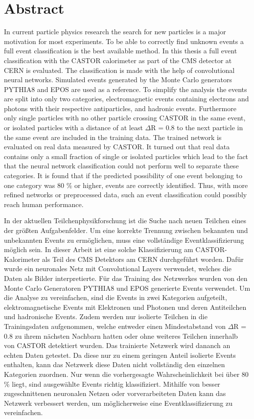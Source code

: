 \section*{Abstract}

In current particle physics research the search for new particles is a major motivation for most experiments. To be able to correctly find unknown events a full event classification is the best available method. In this thesis a full event classification with the CASTOR calorimeter as part of the CMS detector at CERN is evaluated. The classification is made with the help of convolutional neural networks. Simulated events generated by the Monte Carlo generators PYTHIA8 and EPOS are used as a reference. To simplify the analysis the events are split into only two categories, electromagnetic events containing electrons and photons with their respective antiparticles, and hadronic events. Furthermore only single particles with no other particle crossing CASTOR in the same event, or isolated particles with a distance of at least $\Delta$R = 0.8 to the next particle in the same event are included in the training data. The trained network is evaluated on real data measured by CASTOR. It turned out that real data contains only a small fraction of single or isolated particles which lead to the fact that the neural network classification could not perform well to separate these categories. It is found that if the predicted possibility of one event belonging to one category was 80 \% or higher, events are correctly identified. Thus, with more refined networks or preprocessed data, such an event classification could possibly reach human performance.  

\vspace{2cm}

In der aktuellen Teilchenphysikforschung ist die Suche nach neuen Teilchen eines der größten Aufgabenfelder. Um eine korrekte Trennung zwischen bekannten und unbekannten Events zu ermöglichen, muss eine vollständige Eventklassifizierung möglich sein. In dieser Arbeit ist eine solche Klassifizierung am CASTOR-Kalorimeter als Teil des CMS Detektors am CERN durchgeführt worden. Dafür wurde ein neuronales Netz mit Convolutional Layers verwendet, welches die Daten als Bilder interpretierte. Für das Training des Netzwerkes wurden von den Monte Carlo Generatoren PYTHIA8 und EPOS generierte Events verwendet. Um die Analyse zu vereinfachen, sind die Events in zwei Kategorien aufgeteilt, elektromagnetische Events mit Elektronen und Photonen und deren Antiteilchen und hadronische Events. Zudem werden nur isolierte Teilchen in die Trainingsdaten aufgenommen, welche entweder einen Mindestabstand von $\Delta$R = 0.8 zu ihrem nächsten Nachbarn hatten oder ohne weiteres Teilchen innerhalb von CASTOR detektiert wurden. Das trainierte Netzwerk wird dananch an echten Daten getestet. Da diese nur zu einem geringen Anteil isolierte Events enthalten, kann das Netzwerk diese Daten nicht vollständig den einzelnen Kategorien zuordnen. Nur wenn die vorhergesagte Wahrscheinlichkeit bei über 80 \% liegt, sind ausgewählte Events richtig klassifiziert. Mithilfe von besser zugeschnittenen neuronalen Netzen oder vorverarbeiteten Daten kann das Netzwerk verbessert werden, um möglicherweise eine Eventklassifizierung zu vereinfachen.
\cleardoublepage